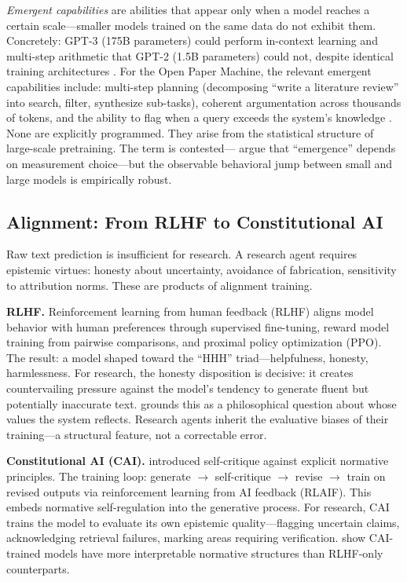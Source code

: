 \documentclass{article}
\begin{document}
\textit{Emergent capabilities} are abilities that appear only when a model reaches a certain scale---smaller models trained on the same data do not exhibit them. Concretely: GPT-3 (175B parameters) could perform in-context learning and multi-step arithmetic that GPT-2 (1.5B parameters) could not, despite identical training architectures \citep{brown2020gpt3}. For the Open Paper Machine, the relevant emergent capabilities include: multi-step planning (decomposing ``write a literature review'' into search, filter, synthesize sub-tasks), coherent argumentation across thousands of tokens, and the ability to flag when a query exceeds the system's knowledge \citep{kalyan2024gpt3}. None are explicitly programmed. They arise from the statistical structure of large-scale pretraining. The term is contested---\citet{schaeffer2024emergent} argue that ``emergence'' depends on measurement choice---but the observable behavioral jump between small and large models is empirically robust.


\subsection{Alignment: From RLHF to Constitutional AI}

Raw text prediction is insufficient for research. A research agent requires epistemic virtues: honesty about uncertainty, avoidance of fabrication, sensitivity to attribution norms. These are products of alignment training.

\textbf{RLHF.} Reinforcement learning from human feedback (RLHF) \citep{ouyang2022rlhf} aligns model behavior with human preferences through supervised fine-tuning, reward model training from pairwise comparisons, and proximal policy optimization (PPO). The result: a model shaped toward the ``HHH'' triad---helpfulness, honesty, harmlessness. For research, the honesty disposition is decisive: it creates countervailing pressure against the model's tendency to generate fluent but potentially inaccurate text. \citet{gabriel2020ai} grounds this as a philosophical question about whose values the system reflects. Research agents inherit the evaluative biases of their training---a structural feature, not a correctable error.

\textbf{Constitutional AI (CAI).} \citet{bai2022constitutional} introduced self-critique against explicit normative principles. The training loop: generate $\rightarrow$ self-critique $\rightarrow$ revise $\rightarrow$ train on revised outputs via reinforcement learning from AI feedback (RLAIF). This embeds normative self-regulation into the generative process. For research, CAI trains the model to evaluate its own epistemic quality---flagging uncertain claims, acknowledging retrieval failures, marking areas requiring verification. \citet{henneking2025inverse} show CAI-trained models have more interpretable normative structures than RLHF-only counterparts.
\end{document}
